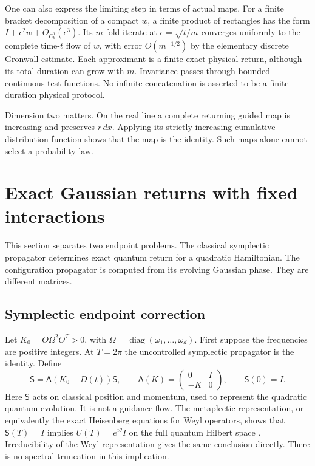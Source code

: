 \documentclass[11pt]{article}
\numberwithin{equation}{section}
\theoremstyle{definition}
\newcommand{\diag}{\operatorname{diag}}
\begin{document}
One can also express the limiting step in terms of actual maps.
For a finite bracket decomposition of a compact $w$, a finite product
of rectangles has the form $I+\epsilon^2w+O_{C_b^1}(\epsilon^3)$.
Its $m$-fold iterate at $\epsilon=\sqrt{t/m}$ converges uniformly
to the complete time-$t$ flow of $w$, with error $O(m^{-1/2})$
by the elementary discrete Gronwall estimate. Each approximant is a
finite exact physical return, although its total duration can grow
with $m$. Invariance passes through bounded continuous test functions.
No infinite concatenation is asserted to be a finite-duration
physical protocol.

Dimension two matters. On the real line a complete returning guided
map is increasing and preserves $r\,dx$. Applying its strictly
increasing cumulative distribution function shows that the map is
the identity. Such maps alone cannot select a probability law.

\section{Exact Gaussian returns with fixed interactions}\label{sec:gaussian}

This section separates two endpoint problems. The classical symplectic
propagator determines exact quantum return for a quadratic Hamiltonian.
The configuration propagator is computed from its evolving Gaussian
phase. They are different matrices.

\subsection{Symplectic endpoint correction}

Let $K_0=O\Omega^2O^T>0$, with
$\Omega=\diag(\omega_1,\ldots,\omega_d)$. First suppose the frequencies
are positive integers. At $T=2\pi$ the uncontrolled symplectic
propagator is the identity. Define
\begin{equation}\label{eq:symplectic}
 \dot{\mathsf S}=\mathsf A(K_0+D(t))\mathsf S,\qquad
 \mathsf A(K)=\begin{pmatrix}0&I\\-K&0\end{pmatrix},\qquad
 \mathsf S(0)=I .
\end{equation}
Here $\mathsf S$ acts on classical position and momentum, used to
represent the quadratic quantum evolution. It is not a guidance flow.
The metaplectic representation, or equivalently the exact Heisenberg
equations for Weyl operators, shows that $\mathsf S(T)=I$ implies
$U(T)=e^{i\theta}I$ on the full quantum Hilbert space
\citep[Chapter 4]{Folland1989}. Irreducibility of the Weyl representation
gives the same conclusion directly. There is no spectral truncation
in this implication.
\end{document}
